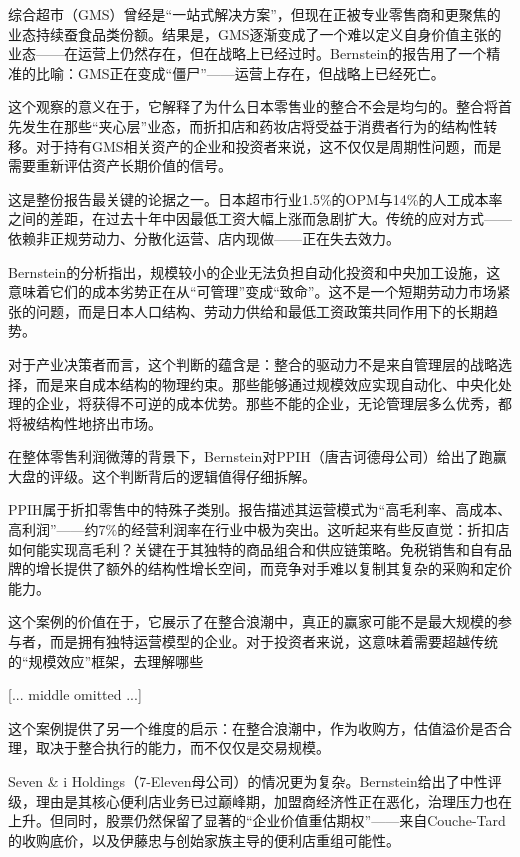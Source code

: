 \documentclass[11pt]{ctexart}
\begin{document}
综合超市（GMS）曾经是“一站式解决方案”，但现在正被专业零售商和更聚焦的业态持续蚕食品类份额。结果是，GMS逐渐变成了一个难以定义自身价值主张的业态——在运营上仍然存在，但在战略上已经过时。Bernstein的报告用了一个精准的比喻：GMS正在变成“僵尸”——运营上存在，但战略上已经死亡。

这个观察的意义在于，它解释了为什么日本零售业的整合不会是均匀的。整合将首先发生在那些“夹心层”业态，而折扣店和药妆店将受益于消费者行为的结构性转移。对于持有GMS相关资产的企业和投资者来说，这不仅仅是周期性问题，而是需要重新评估资产长期价值的信号。

这是整份报告最关键的论据之一。日本超市行业1.5\%的OPM与14\%的人工成本率之间的差距，在过去十年中因最低工资大幅上涨而急剧扩大。传统的应对方式——依赖非正规劳动力、分散化运营、店内现做——正在失去效力。

Bernstein的分析指出，规模较小的企业无法负担自动化投资和中央加工设施，这意味着它们的成本劣势正在从“可管理”变成“致命”。这不是一个短期劳动力市场紧张的问题，而是日本人口结构、劳动力供给和最低工资政策共同作用下的长期趋势。

对于产业决策者而言，这个判断的蕴含是：整合的驱动力不是来自管理层的战略选择，而是来自成本结构的物理约束。那些能够通过规模效应实现自动化、中央化处理的企业，将获得不可逆的成本优势。那些不能的企业，无论管理层多么优秀，都将被结构性地挤出市场。

在整体零售利润微薄的背景下，Bernstein对PPIH（唐吉诃德母公司）给出了跑赢大盘的评级。这个判断背后的逻辑值得仔细拆解。

PPIH属于折扣零售中的特殊子类别。报告描述其运营模式为“高毛利率、高成本、高利润”——约7\%的经营利润率在行业中极为突出。这听起来有些反直觉：折扣店如何能实现高毛利？关键在于其独特的商品组合和供应链策略。免税销售和自有品牌的增长提供了额外的结构性增长空间，而竞争对手难以复制其复杂的采购和定价能力。

这个案例的价值在于，它展示了在整合浪潮中，真正的赢家可能不是最大规模的参与者，而是拥有独特运营模型的企业。对于投资者来说，这意味着需要超越传统的“规模效应”框架，去理解哪些

[... middle omitted ...]

这个案例提供了另一个维度的启示：在整合浪潮中，作为收购方，估值溢价是否合理，取决于整合执行的能力，而不仅仅是交易规模。

Seven \& i Holdings（7-Eleven母公司）的情况更为复杂。Bernstein给出了中性评级，理由是其核心便利店业务已过巅峰期，加盟商经济性正在恶化，治理压力也在上升。但同时，股票仍然保留了显著的“企业价值重估期权”——来自Couche-Tard的收购底价，以及伊藤忠与创始家族主导的便利店重组可能性。
\end{document}
